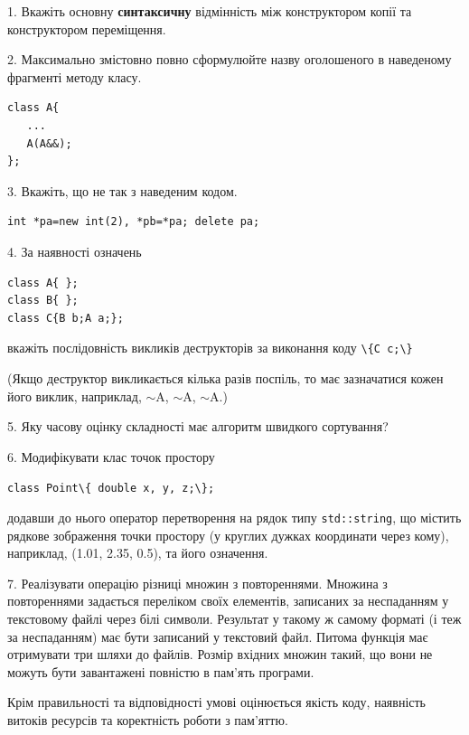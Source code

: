 \documentclass[12pt, ukrainian]{article}
\def\code#1{\Verb!#1!}
\begin{document}
{%
1. Вкажіть основну \textbf{синтаксичну} відмінність між конструктором копії та конструктором переміщення.%
\par
\vspace{2mm}
2. Максимально змістовно повно сформулюйте назву оголошеного в наведеному фрагменті методу класу.
\vspace{-3mm}
\begin{verbatim}class A{
   ...
   A(A&&);
};\end{verbatim}
\vspace{-3mm}
\par
\vspace{2mm}
3. Вкажіть, що не так з наведеним кодом.
\vspace{-3mm}
\begin{verbatim}int *pa=new int(2), *pb=*pa; delete pa;\end{verbatim}
\vspace{-3mm}
\par
\vspace{2mm}
4. За наявності означень
\vspace{-3mm}
\begin{verbatim}
class A{ };
class B{ };
class C{B b;A a;};\end{verbatim}
\vspace{-3mm}
вкажіть послідовність викликів деструкторів за виконання коду \code{\{C c;\}} 

(Якщо деструктор викликається кілька разів поспіль, то має зазначатися кожен його виклик, наприклад, $\sim$A, $\sim$A, $\sim$A.)

\vspace{2mm}
5. Яку часову оцінку складності має алгоритм швидкого сортування?
\par
\vspace{2mm}
6. Модифікувати клас точок простору 

\qquad\code{class Point\{ double x, y, z;\};}


додавши до нього оператор перетворення на рядок типу \code{std::string}, що містить рядкове зображення точки простору (у круглих дужках координати через кому), наприклад, (1.01, 2.35, 0.5), та його означення.%
\par
\vspace{2mm}
7. 
Реалізувати операцію різниці множин з повтореннями. Множина з повтореннями задається переліком своїх елементів, записаних за неспаданням у текстовому файлі через білі символи. Результат у такому ж самому форматі (і теж за неспаданням) має бути записаний у текстовий файл. Питома функція має отримувати три шляхи до файлів. Розмір вхідних множин такий, що вони не можуть бути завантажені повністю в пам’ять програми.

Крім правильності та відповідності умові оцінюється якість коду, наявність витоків ресурсів та коректність роботи з пам'яттю. 

}
\end{document}

